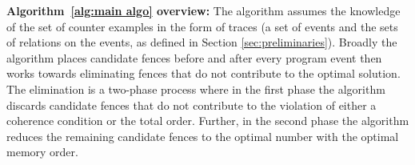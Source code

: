 \begin{algorithm}[h]
%		
%			
%		
%		
%		
%		
\end{algorithm}

\noindent
{\bf Algorithm~\ref{alg:main algo} overview:} 
The algorithm assumes the knowledge of the set of counter
examples in the form of traces (\ie a set of events and 
the sets of relations on the events, as defined in Section
\ref{sec:preliminaries}).
%
Broadly the algorithm places candidate fences before and
after every program event then works towards eliminating 
fences that do not contribute to the optimal solution.
%
The elimination is a two-phase process where in the first
phase the algorithm discards candidate fences that do not 
contribute to the violation of either a coherence condition 
or the \sc total order. 
Further, in the second phase the algorithm reduces the 
remaining candidate fences to the optimal number with
the optimal memory order.


